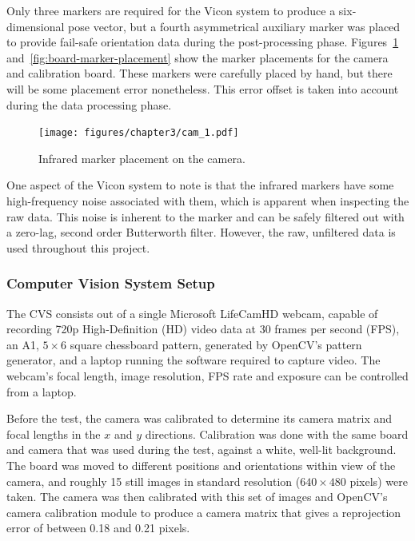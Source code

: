 Only three markers are required for the Vicon system to produce a six-dimensional pose vector, but a fourth asymmetrical auxiliary marker was placed to provide fail-safe orientation data during the post-processing phase. Figures~\ref{fig:cam-marker-placement} and~\ref{fig:board-marker-placement} show the marker placements for the camera and calibration board. These markers were carefully placed by hand, but there will be some placement error nonetheless. This error offset is taken into account during the data processing phase. 

\begin{figure}
   \centering 
   \texttt{[image: figures/chapter3/cam\_1.pdf]}
   \caption{Infrared marker placement on the camera.}
\label{fig:cam-marker-placement}
\end{figure}


One aspect of the Vicon system to note is that the infrared markers have some high-frequency noise associated with them, which is apparent when inspecting the raw data. This noise is inherent to the marker and can be safely filtered out with a zero-lag, second order Butterworth filter. However, the raw, unfiltered data is used throughout this project. 

\subsubsection{Computer Vision System Setup}

The CVS consists out of a single Microsoft LifeCamHD webcam, capable of recording 720p High-Definition (HD) video data at 30 frames per second (FPS), an A1, $5\times6$ square chessboard pattern, generated by OpenCV's pattern generator, and a laptop running the software required to capture video. The webcam's focal length, image resolution, FPS rate and exposure can be controlled from a laptop. 

Before the test, the camera was calibrated to determine its camera matrix and focal lengths in the $x$ and $y$ directions. Calibration was done with the same board and camera that was used during the test, against a white, well-lit background. The board was moved to different positions and orientations within view of the camera, and roughly 15 still images in standard resolution ($640\times480$ pixels) were taken. The camera was then calibrated with this set of images and OpenCV's camera calibration module to produce a camera matrix that gives a reprojection error of between 0.18 and 0.21 pixels. 

